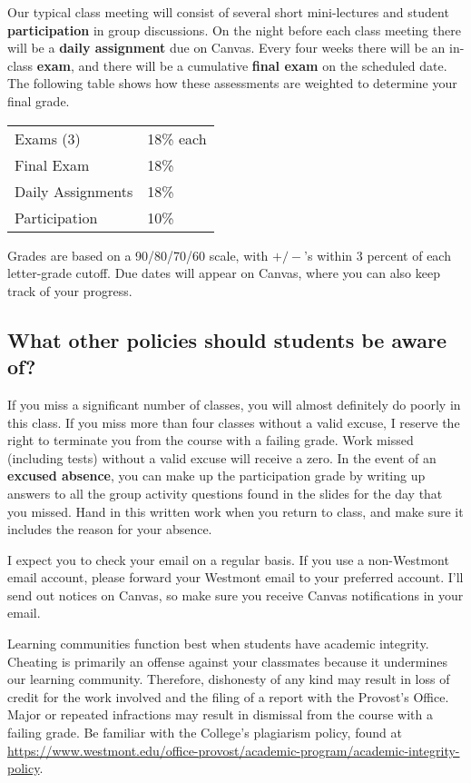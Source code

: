 \documentclass[
  twoside]{article}
\begin{document}
Our typical class meeting will consist of several short mini-lectures
and student \textbf{participation} in group discussions. On the night
before each class meeting there will be a \textbf{daily assignment} due
on Canvas. Every four weeks there will be an in-class \textbf{exam}, and
there will be a cumulative \textbf{final exam} on the scheduled date.
The following table shows how these assessments are weighted to
determine your final grade.

\begin{tabular}[t]{ll}
\toprule
Exams (3) & 18\% each\\
Final Exam & 18\%\\
Daily Assignments & 18\%\\
Participation & 10\%\\
\bottomrule
\end{tabular}

Grades are based on a 90/80/70/60 scale, with \(+/-\)'s within 3 percent
of each letter-grade cutoff. Due dates will appear on Canvas, where you
can also keep track of your progress.

\hypertarget{what-other-policies-should-students-be-aware-of}{%
\subsection{What other policies should students be aware
of?}\label{what-other-policies-should-students-be-aware-of}}

If you miss a significant number of classes, you will almost definitely
do poorly in this class. If you miss more than four classes without a
valid excuse, I reserve the right to terminate you from the course with
a failing grade. Work missed (including tests) without a valid excuse
will receive a zero. In the event of an \textbf{excused absence}, you
can make up the participation grade by writing up answers to all the
group activity questions found in the slides for the day that you
missed. Hand in this written work when you return to class, and make
sure it includes the reason for your absence.

I expect you to check your email on a regular basis. If you use a
non-Westmont email account, please forward your Westmont email to your
preferred account. I'll send out notices on Canvas, so make sure you
receive Canvas notifications in your email.

Learning communities function best when students have academic
integrity. Cheating is primarily an offense against your classmates
because it undermines our learning community. Therefore, dishonesty of
any kind may result in loss of credit for the work involved and the
filing of a report with the Provost's Office. Major or repeated
infractions may result in dismissal from the course with a failing
grade. Be familiar with the College's plagiarism policy, found at
\url{https://www.westmont.edu/office-provost/academic-program/academic-integrity-policy}.
\end{document}
